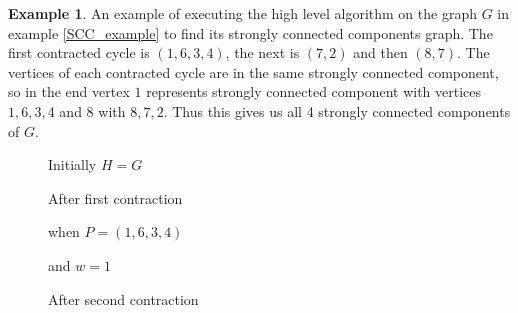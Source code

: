 \documentclass{report}
\theoremstyle{plain}
\theoremstyle{definition}
\newtheorem{example}{Example}
\theoremstyle{remark}
\numberwithin{definition}{chapter}
\numberwithin{example}{chapter}
\numberwithin{figure}{chapter}
\begin{document}
\begin{example}

An example of executing the high level algorithm on the graph $G$ in example \ref{SCC_example} to find its strongly connected components graph. The first contracted cycle is $(1,6,3,4)$, the next is $(7,2)$ and then $(8,7)$. The vertices of each contracted cycle are in the same strongly connected component, so in the end vertex $1$ represents strongly connected component with vertices $1,6,3,4$ and $8$ with $8,7,2$. Thus this gives us all 4 strongly connected components of $G$.

\begin{figure}[h]
\center

\begin{minipage}[h]{0.24\textwidth}

Initially $H=G$
\end{minipage}
\hfill
{}

After first contraction

when $P=(1,6,3,4)$

and $w=1$
\endminipage\hfill
{}

After second contraction


\end{figure}
\end{example}
\end{document}
